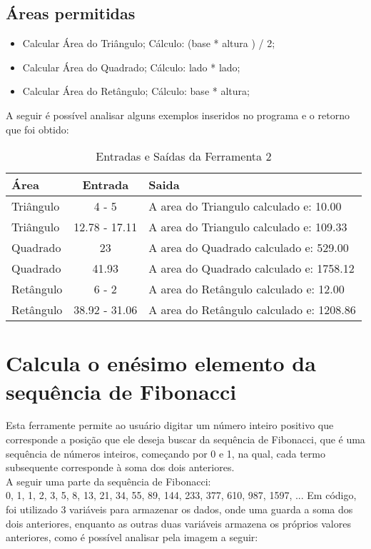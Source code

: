 \documentclass[12pt]{article}
\begin{document}
\subsection{Áreas permitidas}
\begin{itemize}
\item Calcular Área do Triângulo;
\subitem Cálculo: (base * altura ) / 2;
\item Calcular Área do Quadrado;
\subitem Cálculo: lado * lado;
\item Calcular Área do Retângulo;
\subitem Cálculo: base * altura;
\end{itemize}
A seguir é possível analisar alguns exemplos inseridos no programa e o retorno que foi obtido:

\FloatBarrier
\begin{table}[ht]
\centering
\begin{tabular}{|l|c|l|}
\hline
\textbf{Área} & \textbf{Entrada} & \textbf{Saida}\\
\hline
Triângulo & 4 - 5 & A area do Triangulo calculado e: 10.00\\
Triângulo & 12.78 - 17.11 & A area do Triangulo calculado e: 109.33\\
Quadrado & 23 & A area do Quadrado calculado e: 529.00\\
Quadrado & 41.93 & A area do Quadrado calculado e: 1758.12\\
Retângulo & 6 - 2 & A area do Retângulo calculado e: 12.00\\
Retângulo & 38.92 - 31.06 & A area do Retângulo calculado e: 1208.86\\

\hline
\end{tabular}
\caption{Entradas e Saídas da Ferramenta 2}
\end{table} 

\newpage

\section{Calcula o enésimo elemento da sequência de Fibonacci}
Esta ferramente permite ao usuário digitar um número inteiro positivo que corresponde a posição que ele deseja buscar da sequência de Fibonacci, que é uma sequência de números inteiros, começando por 0 e 1, na qual, cada termo subsequente corresponde à soma dos dois anteriores. \\
A seguir uma parte da sequência de Fibonacci:\\
0, 1, 1, 2, 3, 5, 8, 13, 21, 34, 55, 89, 144, 233, 377, 610, 987, 1597, ...
Em código, foi utilizado 3 variáveis para armazenar os dados, onde uma guarda a soma dos dois anteriores, enquanto as outras duas variáveis armazena os próprios valores anteriores, como é possível analisar pela imagem a seguir:
\end{document}
